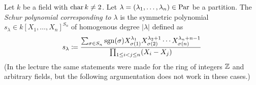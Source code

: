 \begin{expl}[]
  Let $k$ be a field with $\operatorname{char} k \neq 2$.
  Let $\lambda = (\lambda_1, \dotsc, \lambda_n) \in \operatorname{Par}$ be a partition.
  The \emph{Schur polynomial corresponding to $\lambda$} is the symmetric polynomial $s_\lambda \in k[X_1, \dotsc, X_n]^{S_n}$ of homogenous degree $|\lambda|$ defined as
  \[
              s_\lambda
    \coloneqq \frac
              {
                \sum_{\sigma \in S_n} \operatorname{sgn}(\sigma)          X_{\sigma(1)}^{\lambda_1}
                                                            X_{\sigma(2)}^{\lambda_2 + 1}
                                                    \dotsm  X_{\sigma(n)}^{\lambda_n + n-1}
               }{
                \prod_{1 \leq i < j \leq n} (X_i - X_j)
               }
  \]
  (In the lecture the same statements were made for the ring of integers $\mathbb{Z}$ and arbitrary fields, but the following argumentation does not work in these cases.)
  

\end{expl}
